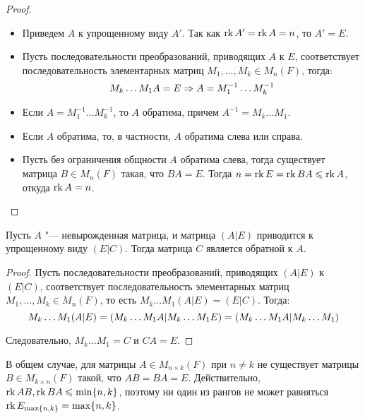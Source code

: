 \begin{proof}~
	\begin{itemize}
		\item{} Приведем $A$ к упрощенному виду $A'$. Так как $\operatorname{rk}{A'} = \operatorname{rk}{A} = n$, то $A' = E$.
		
		\item{} Пусть последовательности преобразований, приводящих $A$ к $E$, соответствует последовательность элементарных матриц $M_1, \dots, M_{k} \in M_n(F)$, тогда:
		\[M_k\dots M_1A = E \Rightarrow A = M_1^{-1}\dots M_k^{-1}\]
		
		\item{} Если $A = M_1^{-1}\dots M_k^{-1}$, то $A$ обратима, причем $A^{-1} = M_k\dots M_1$.
		
		\item{} Если $A$ обратима, то, в частности, $A$ обратима слева или справа.
		
		\item{} Пусть без ограничения общности $A$ обратима слева, тогда существует матрица $B \in M_n(F)$ такая, что $BA = E$. Тогда $n = \rk{E} = \rk{BA} \hm{\le} \rk{A}$, откуда $\operatorname{rk}{A} = n$.\qedhere
	\end{itemize}
\end{proof}

\begin{corollary}
 	Пусть $A$ "--- невырожденная матрица, и матрица $(A|E)$ приводится к упрощенному виду $(E|C)$. Тогда матрица $C$ является обратной к $A$.
\end{corollary}

\begin{proof}
	Пусть последовательности преобразований, приводящих $(A|E)$ к $(E|C)$, соответствует последовательность элементарных матриц $M_1, \dots, M_{k} \in M_n(F)$, то есть $M_k\dots M_1(A|E) = (E|C)$. Тогда:
	\[M_k\dots M_1(A|E) \hm{=} (M_k\dots M_1A|M_k\dots M_1E) = (M_k\dots M_1A|M_k\dots M_1)\]
	
	Следовательно, $M_k\dots M_1 = C$ и $CA = E$.
\end{proof}

\begin{note}
	В общем случае, для матрицы $A \in M_{n \times k}(F)$ при $n \ne k$ не существует матрицы $B \in M_{k \times n}(F)$ такой, что $AB = BA = E$. Действительно, $\operatorname{rk}{AB}, \operatorname{rk}{BA} \leqslant \min \{n, k\}$, поэтому ни один из рангов не может равняться $\rk{E_{\max\{n, k\}}} \hm{=} \max\{n, k\}$.
\end{note}

